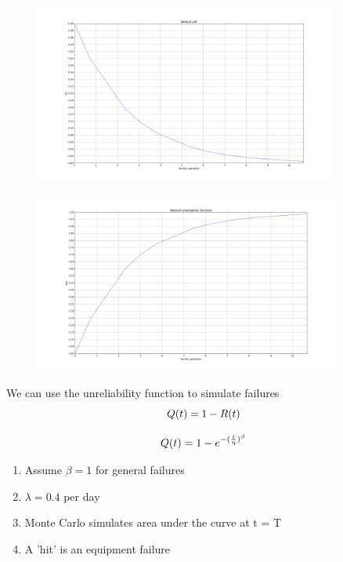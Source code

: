 \documentclass[aspectratio=1610,pdftex,dvipsnames,compress,xcolor={dvipsnames}]{beamer}
\begin{document}
\begin{frame}{}
    \begin{figure}
        \centering
        \includegraphics[width=0.89\textwidth]{img/weibull.jpg}
    \end{figure}
\end{frame}


\begin{frame}{}
    \begin{figure}
        \centering
        \includegraphics[width=0.90\textwidth]{unreliability.jpg}
    \end{figure}
\end{frame}


\begin{frame}{We can use the unreliability function to simulate failures}
    \begin{equation}
        \LARGE
        Q(t) = 1 - R(t)
    \end{equation}

    \begin{equation}
        \LARGE
        Q(t) = 1 - e^{-(\frac{t}{\eta})^{\beta}}
    \end{equation}

    \begin{enumerate}[series=outerlist,topsep=0pt,itemsep=15pt,leftmargin=*,label=(\arabic*)]
        \item[]Assume $\beta = 1$ for general failures
        \item[]$\lambda = 0.4$ per day
        \item[]Monte Carlo simulates area under the curve at t = T
        \item[]A 'hit' is an equipment failure
    \end{enumerate}
\end{frame}
\end{document}

